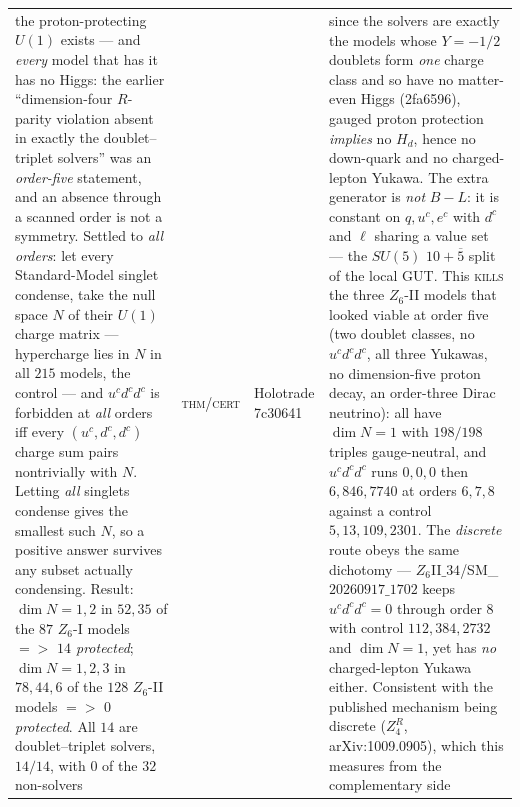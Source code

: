 \documentclass[12pt,a4paper]{article}
\def\mathbf#1{#1}%
\def\textbf#1{#1}%
\def\texttt#1{#1}%
\def\Rightarrow{ => }%
\theoremstyle{definition}
\begin{document}
\begin{center}
\begin{tabular}{@{}p{}llp{}@{}}
\textbf{the proton-protecting $U(1)$ exists --- and \emph{every} model that has it has no Higgs}: the earlier ``dimension-four $R$-parity violation absent in exactly the doublet--triplet solvers'' was an \emph{order-five} statement, and an absence through a scanned order is not a symmetry. Settled to \emph{all orders}: let every Standard-Model singlet condense, take the null space $N$ of their $U(1)$ charge matrix --- hypercharge lies in $N$ in all $215$ models, the control --- and $u^cd^cd^c$ is forbidden at \emph{all} orders iff every $(u^c,d^c,d^c)$ charge sum pairs nontrivially with $N$. Letting \emph{all} singlets condense gives the smallest such $N$, so a positive answer survives any subset actually condensing. Result: $\dim N=1,2$ in $52,35$ of the $87$ $Z_6$-I models $\Rightarrow$ \emph{$14$ protected}; $\dim N=1,2,3$ in $78,44,6$ of the $128$ $Z_6$-II models $\Rightarrow$ \emph{$0$ protected}. \textbf{All $14$ are doublet--triplet solvers}, $14/14$, with $0$ of the $32$ non-solvers & \textsc{thm}/\textsc{cert} & Holotrade \texttt{7c30641} & since the solvers are exactly the models whose $Y=-1/2$ doublets form \emph{one} charge class and so have no matter-even Higgs (\texttt{2fa6596}), gauged proton protection \emph{implies} no $H_d$, hence no down-quark and no charged-lepton Yukawa. The extra generator is \emph{not} $B-L$: it is constant on $q,u^c,e^c$ with $d^c$ and $\ell$ sharing a value set --- the $SU(5)$ $\mathbf{10}+\overline{\mathbf{5}}$ split of the local GUT. This \textsc{kills} the three $Z_6$-II models that looked viable at order five (two doublet classes, no $u^cd^cd^c$, all three Yukawas, no dimension-five proton decay, an order-three Dirac neutrino): all have $\dim N=1$ with $198/198$ triples gauge-neutral, and $u^cd^cd^c$ runs $0,0,0$ then $6,846,7740$ at orders $6,7,8$ against a control $5,13,109,2301$. The \emph{discrete} route obeys the same dichotomy --- $Z_6$II$\_34$/SM\_$20260917\_1702$ keeps $u^cd^cd^c=0$ through order $8$ with control $112,384,2732$ and $\dim N=1$, yet has \emph{no} charged-lepton Yukawa either. Consistent with the published mechanism being discrete ($Z_4^R$, \texttt{arXiv:1009.0905}), which this measures from the complementary side \\

\end{tabular}
\end{center}
\end{document}
